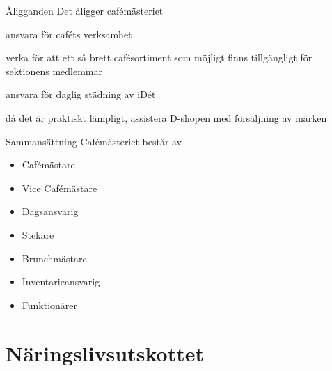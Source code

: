 \documentclass[pdfbookmarks,a4paper,11pt]{article}
\newlength{\itemcollength}
\newenvironment{reglemlista}{%
  \begin{list}{}{%
      \setlength{\labelwidth}{\itemcollength}%
      \setlength{\leftmargin}{\labelwidth + \labelsep}%
      \renewcommand{\makelabel}[1]{%
        \raisebox{0pt}[1ex][0pt]{%
          \makebox[\labelwidth][l]{%
            \parbox[t]{\itemcollength}{%
              \raggedright\hspace{0pt}##1}}}\hfill}%
      }}{%
  \end{list}}
\begin{document}
\begin{reglemlista}

	\item[Åligganden]
	Det åligger cafémästeriet
	\begin{attlista}
		\item ansvara för caféts verksamhet
		\item verka för att ett så brett cafésortiment som möjligt finns tillgängligt för sektionens medlemmar
		\item ansvara för daglig städning av iDét
		\item då det är praktiskt lämpligt, assistera D-shopen med försäljning av märken
	\end{attlista}

	\item[Sammansättning]
	Cafémästeriet består av
	\begin{itemize}
		\item Cafémästare
		\item Vice Cafémästare
		\item Dagsansvarig
		\item Stekare
        \item Brunchmästare
        \item Inventarieansvarig
		\item Funktionärer
	\end{itemize}

\end{reglemlista}

\section{Näringslivsutskottet}
\end{document}
